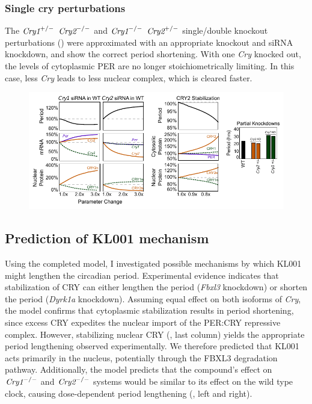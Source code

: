 \subsubsection{Single cry perturbations}
The $\text{\it Cry1}^{+/-}$ $\text{\it Cry2}^{-/-}$ and $\text{\it Cry1}^{-/-}$ $\text{\it Cry2}^{+/-}$ single/double knockout perturbations (\cite{VanderHorst1999}) were approximated with an appropriate knockout and siRNA knockdown, and show the correct period shortening. 
With one {\it Cry} knocked out, the levels of cytoplasmic PER are no longer stoichiometrically limiting. 
In this case, less {\it Cry} leads to less nuclear complex, which is cleared faster.

\begin{figure}[bt]
  \centering
  \includegraphics[width=\textwidth]{chap2/figures/experimentalvalidation.pdf}
   \label{fig:experimentalvalidation}
\end{figure}

\subsection{Prediction of KL001 mechanism}
Using the completed model, I investigated possible mechanisms by which KL001 might lengthen the circadian period. 
Experimental evidence indicates that stabilization of CRY can either lengthen the period ({\it Fbxl3} knockdown) or shorten the period ({\it Dyrk1a} knockdown). 
Assuming equal effect on both isoforms of {\it Cry}, the model confirms that cytoplasmic stabilization results in period shortening, since excess CRY expedites the nuclear import of the PER:CRY repressive complex. 
However, stabilizing nuclear CRY (, last column) yields the appropriate period lengthening observed experimentally. 
We therefore predicted that KL001 acts primarily in the nucleus, potentially through the FBXL3 degradation pathway. 
Additionally, the model predicts that the compound’s effect on $\text{\it Cry1}^{-/-}$ and $\text{\it Cry2}^{-/-}$ systems would be similar to its effect on the wild type clock, causing dose-dependent period lengthening (, left and right).


